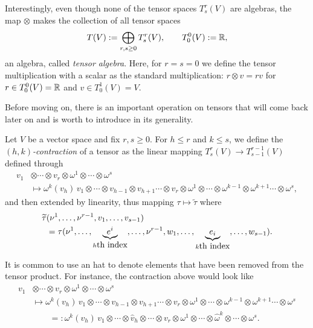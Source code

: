 \begin{remark}
  Interestingly, even though none of the tensor spaces $T_s^r(V)$ are algebras, the map $\otimes$ makes the collection of all tensor spaces
  \begin{equation}
    T(V) := \bigoplus_{r,s\geq 0} T_s^r(V), \qquad T_0^0(V):= \mathbb{R},
  \end{equation}
  an algebra, called \emph{tensor algebra}.
  Here, for $r=s=0$ we define the tensor multiplication with a scalar as the standard multiplication: $r\otimes v = r v$ for $r\in T_0^0(V)=\mathbb{R}$ and $v\in T^1_0(V)=V$.
\end{remark}

Before moving on, there is an important operation on tensors that will come back later on and is worth to introduce in its generality.

\begin{definition}
  Let $V$ be a vector space and fix $r,s\geq0$.
  For $h\leq r$ and $k\leq s$, we define the \emph{$(h,k)$-contraction} of a tensor as the linear mapping $T_s^r(V)\to T_{s-1}^{r-1}(V)$ defined through
  \begin{align}
    v_1 & \otimes\cdots\otimes v_r\otimes\omega^1\otimes\cdots\otimes\omega^s \\
        & \mapsto \omega^k(v_h)\, v_1\otimes\cdots\otimes v_{h-1}\otimes v_{h+1}\cdots\otimes v_r\otimes\omega^1\otimes\cdots\otimes\omega^{k-1}\otimes\omega^{k+1}\cdots\otimes\omega^s,
  \end{align}
  and then extended by linearity, thus mapping $\tau \mapsto \widetilde\tau$ where
  \begin{align}
    \widetilde\tau & (\nu^1,\ldots,\nu^{r-1}, v_1,\ldots,v_{s-1}) \\
                   & = \tau(\nu^1,\ldots,\LaTeXunderbrace{e^i}_{h\mbox{th index}},\ldots,\nu^{r-1},w_1,\ldots,\LaTeXunderbrace{e_i}_{k\mbox{th index}},\ldots,w_{s-1}).
  \end{align}
\end{definition}

\begin{notation}\label{notation:hat}
  It is common to use an hat to denote elements that have been removed from the tensor product.
  For instance, the contraction above would look like
  \begin{align}
    v_1 & \otimes\cdots\otimes v_r\otimes\omega^1\otimes\cdots\otimes\omega^s \\
        & \mapsto \omega^k(v_h)\, v_1\otimes\cdots\otimes v_{h-1}\otimes v_{h+1}\cdots\otimes v_r\otimes\omega^1\otimes\cdots\otimes\omega^{k-1}\otimes\omega^{k+1}\cdots\otimes\omega^s \\
        &\qquad  =: \omega^k(v_h)\, v_1\otimes\cdots\otimes \widehat{v}_{h} \otimes \cdots\otimes v_r\otimes\omega^1\otimes\cdots\otimes\widehat{\omega}^{k}\otimes\cdots\otimes\omega^s.
  \end{align}
\end{notation}

